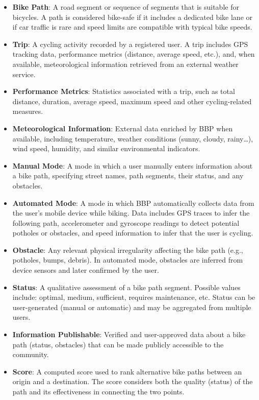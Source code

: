 \begin{itemize}
    \item \textbf{Bike Path}: A road segment or sequence of segments that is suitable for bicycles. A path is considered bike-safe if it includes a dedicated bike lane or if car traffic is rare and speed limits are compatible with typical bike speeds.
    \item \textbf{Trip}: A cycling activity recorded by a registered user. A trip includes GPS tracking data, performance metrics (distance, average speed, etc.), and, when available, meteorological information retrieved from an external weather service.
    \item \textbf{Performance Metrics}: Statistics associated with a trip, such as total distance, duration, average speed, maximum speed and other cycling-related measures.
    \item \textbf{Meteorological Information}: External data enriched by BBP when available, including temperature, weather conditions (sunny, cloudy, rainy…), wind speed, humidity, and similar environmental indicators.
    \item \textbf{Manual Mode}: A mode in which a user manually enters information about a bike path, specifying street names, path segments, their status, and any obstacles.
    \item \textbf{Automated Mode}: A mode in which BBP automatically collects data from the user’s mobile device while biking. Data includes GPS traces to infer the following path, accelerometer and gyroscope readings to detect potential potholes or obstacles, and speed information to infer that the user is cycling.
    \item \textbf{Obstacle}: Any relevant physical irregularity affecting the bike path (e.g., potholes, bumps, debris). In automated mode, obstacles are inferred from device sensors and later confirmed by the user.
    \item \textbf{Status}: A qualitative assessment of a bike path segment. Possible values include: optimal, medium, sufficient, requires maintenance, etc. Status can be user-generated (manual or automatic) and may be aggregated from multiple users.
    \item \textbf{Information Publishable}: Verified and user-approved data about a bike path (status, obstacles) that can be made publicly accessible to the community.
    \item \textbf{Score}: A computed score used to rank alternative bike paths between an origin and a destination. The score considers both the quality (status) of the path and its effectiveness in connecting the two points.
\end{itemize}

